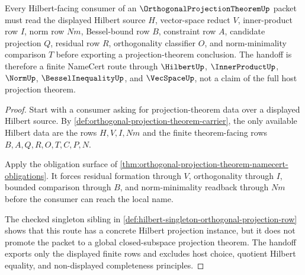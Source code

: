 \begin{theorem}\label{thm:orthogonal-projection-theorem-hilbert-handoff}
Every Hilbert-facing consumer of an $\OrthogonalProjectionTheoremUp$ packet must read the displayed Hilbert source $H$, vector-space reduct $V$, inner-product row $I$, norm row $Nm$, Bessel-bound row $B$, constraint row $A$, candidate projection $Q$, residual row $R$, orthogonality classifier $O$, and norm-minimality comparison $T$ before exporting a projection-theorem conclusion. The handoff is therefore a finite NameCert route through $\HilbertUp$, $\InnerProductUp$, $\NormUp$, $\BesselInequalityUp$, and $\VecSpaceUp$, not a claim of the full host projection theorem.
\end{theorem}
\begin{proof}
Start with a consumer asking for projection-theorem data over a displayed Hilbert source. By \autoref{def:orthogonal-projection-theorem-carrier}, the only available Hilbert data are the rows $H,V,I,Nm$ and the finite theorem-facing rows $B,A,Q,R,O,T,C,P,N$.

Apply the obligation surface of \autoref{thm:orthogonal-projection-theorem-namecert-obligations}. It forces residual formation through $V$, orthogonality through $I$, bounded comparison through $B$, and norm-minimality readback through $Nm$ before the consumer can reach the local name.

The checked singleton sibling in \autoref{def:hilbert-singleton-orthogonal-projection-row} shows that this route has a concrete Hilbert projection instance, but it does not promote the packet to a global closed-subspace projection theorem. The handoff exports only the displayed finite rows and excludes host choice, quotient Hilbert equality, and non-displayed completeness principles.
\end{proof}

\begin{closurestatus}{\OrthogonalProjectionTheoremUp}
  \theoryclosure{\seedClosure}
  \formalstatus{\unformalizedV}
\end{closurestatus}
